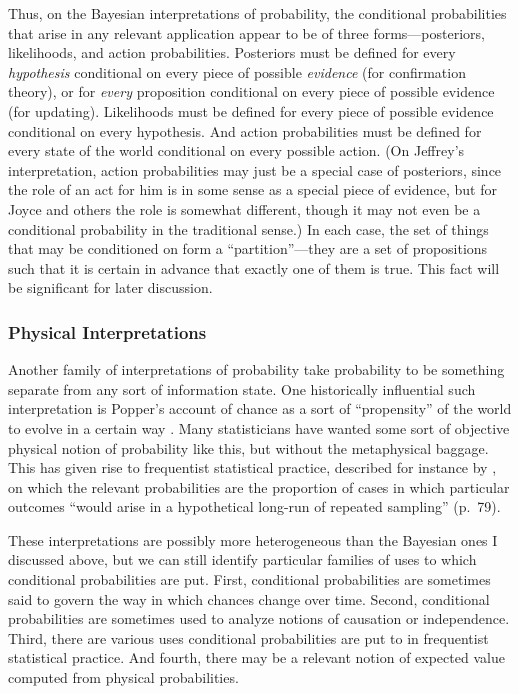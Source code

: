 Thus, on the Bayesian interpretations of probability, the conditional probabilities that arise in any relevant application appear to be of three forms---posteriors, likelihoods, and action probabilities. Posteriors must be defined for every \textit{hypothesis} conditional on every piece of possible \textit{evidence} (for confirmation theory), or for \emph{every} proposition conditional on every piece of possible evidence (for updating). Likelihoods must be defined for every piece of possible evidence conditional on every hypothesis. And action probabilities must be defined for every state of the world conditional on every possible action. (On Jeffrey's interpretation, action probabilities may just be a special case of posteriors, since the role of an act for him is in some sense as a special piece of evidence, but for Joyce and others the role is somewhat different, though it may not even be a conditional probability in the traditional sense.) In each case, the set of things that may be conditioned on form a ``partition''---they are a set of propositions such that it is certain in advance that exactly one of them is true. This fact will be significant for later discussion.

\subsubsection{Physical Interpretations}

Another family of interpretations of probability take probability to be something separate from any sort of information state. One historically influential such interpretation is Popper's account of chance as a sort of ``propensity'' of the world to evolve in a certain way \citep{propensity}. Many statisticians have wanted some sort of objective physical notion of probability like this, but without the metaphysical baggage. This has given rise to frequentist statistical practice, described for instance by \citet{mayocox}, on which the relevant probabilities are the proportion of cases in which particular outcomes ``would arise in a hypothetical long-run of repeated sampling'' (p.\ 79).

These interpretations are possibly more heterogeneous than the Bayesian ones I discussed above, but we can still identify particular families of uses to which conditional probabilities are put. First, conditional probabilities are sometimes said to govern the way in which chances change over time. Second, conditional probabilities are sometimes used to analyze notions of causation or independence. Third, there are various uses conditional probabilities are put to in frequentist statistical practice. And fourth, there may be a relevant notion of expected value computed from physical probabilities.


